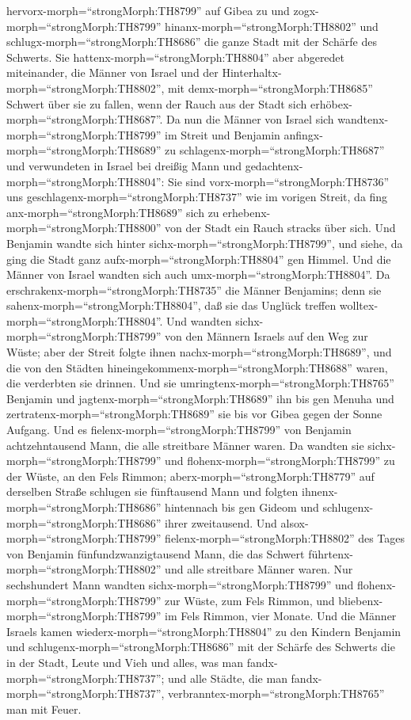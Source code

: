 hervorx-morph=``strongMorph:TH8799'' auf Gibea zu und
zogx-morph=``strongMorph:TH8799'' hinanx-morph=``strongMorph:TH8802''
und schlugx-morph=``strongMorph:TH8686'' die ganze Stadt mit der Schärfe
des Schwerts.  Sie hattenx-morph=``strongMorph:TH8804''
aber abgeredet miteinander, die Männer von Israel und der
Hinterhaltx-morph=``strongMorph:TH8802'', mit
demx-morph=``strongMorph:TH8685'' Schwert über sie zu fallen, wenn der
Rauch aus der Stadt sich erhöbex-morph=``strongMorph:TH8687''.
 Da nun die Männer von Israel sich
wandtenx-morph=``strongMorph:TH8799'' im Streit und Benjamin
anfingx-morph=``strongMorph:TH8689'' zu
schlagenx-morph=``strongMorph:TH8687'' und verwundeten in Israel bei
dreißig Mann und gedachtenx-morph=``strongMorph:TH8804'': Sie sind
vorx-morph=``strongMorph:TH8736'' uns
geschlagenx-morph=``strongMorph:TH8737'' wie im vorigen Streit,
 da fing anx-morph=``strongMorph:TH8689'' sich zu
erhebenx-morph=``strongMorph:TH8800'' von der Stadt ein Rauch stracks
über sich. Und Benjamin wandte sich hinter
sichx-morph=``strongMorph:TH8799'', und siehe, da ging die Stadt ganz
aufx-morph=``strongMorph:TH8804'' gen Himmel.  Und die
Männer von Israel wandten sich auch umx-morph=``strongMorph:TH8804''. Da
erschrakenx-morph=``strongMorph:TH8735'' die Männer Benjamins; denn sie
sahenx-morph=``strongMorph:TH8804'', daß sie das Unglück treffen
wolltex-morph=``strongMorph:TH8804''.  Und wandten
sichx-morph=``strongMorph:TH8799'' von den Männern Israels auf den Weg
zur Wüste; aber der Streit folgte ihnen
nachx-morph=``strongMorph:TH8689'', und die von den Städten
hineingekommenx-morph=``strongMorph:TH8688'' waren, die verderbten sie
drinnen.  Und sie umringtenx-morph=``strongMorph:TH8765''
Benjamin und jagtenx-morph=``strongMorph:TH8689'' ihn bis gen Menuha und
zertratenx-morph=``strongMorph:TH8689'' sie bis vor Gibea gegen der
Sonne Aufgang.  Und es fielenx-morph=``strongMorph:TH8799''
von Benjamin achtzehntausend Mann, die alle streitbare Männer waren.
 Da wandten sie sichx-morph=``strongMorph:TH8799'' und
flohenx-morph=``strongMorph:TH8799'' zu der Wüste, an den Fels Rimmon;
aberx-morph=``strongMorph:TH8779'' auf derselben Straße schlugen sie
fünftausend Mann und folgten ihnenx-morph=``strongMorph:TH8686''
hintennach bis gen Gideom und schlugenx-morph=``strongMorph:TH8686''
ihrer zweitausend.  Und alsox-morph=``strongMorph:TH8799''
fielenx-morph=``strongMorph:TH8802'' des Tages von Benjamin
fünfundzwanzigtausend Mann, die das Schwert
führtenx-morph=``strongMorph:TH8802'' und alle streitbare Männer waren.
 Nur sechshundert Mann wandten
sichx-morph=``strongMorph:TH8799'' und
flohenx-morph=``strongMorph:TH8799'' zur Wüste, zum Fels Rimmon, und
bliebenx-morph=``strongMorph:TH8799'' im Fels Rimmon, vier Monate.
 Und die Männer Israels kamen
wiederx-morph=``strongMorph:TH8804'' zu den Kindern Benjamin und
schlugenx-morph=``strongMorph:TH8686'' mit der Schärfe des Schwerts die
in der Stadt, Leute und Vieh und alles, was man
fandx-morph=``strongMorph:TH8737''; und alle Städte, die man
fandx-morph=``strongMorph:TH8737'',
verbranntex-morph=``strongMorph:TH8765'' man mit Feuer.

